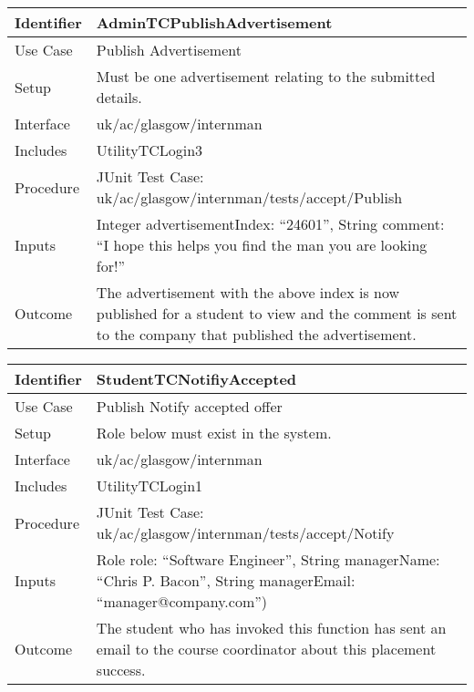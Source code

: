 \vspace{2em}

\begin{tabularx}{\textwidth}{|T|L|}
\hline
Identifier & AdminTCPublishAdvertisement\\
\hline
Use Case & Publish Advertisement\\
\hline
Setup & Must be one advertisement relating to the submitted details.\\
\hline
Interface & uk/ac/glasgow/internman\\
\hline
Includes & UtilityTCLogin3\\
\hline
Procedure & JUnit Test Case: uk/ac/glasgow/internman/tests/accept/Publish\\
\hline
Inputs & Integer advertisementIndex: ``24601'', String comment:
``I hope this helps you find the man you are looking for!''\\
\hline
Outcome & The advertisement with the above index is now published for
a student to view and the comment is sent to the company that
published the advertisement.\\
\hline
\end{tabularx}

\vspace{2em}

\begin{tabularx}{\textwidth}{|T|L|}
\hline
Identifier & StudentTCNotifiyAccepted\\
\hline
Use Case & Publish Notify accepted offer\\
\hline
Setup & Role below must exist in the system.\\
\hline
Interface & uk/ac/glasgow/internman\\
\hline
Includes & UtilityTCLogin1\\
\hline
Procedure & JUnit Test Case: uk/ac/glasgow/internman/tests/accept/Notify\\
\hline
Inputs & Role role: ``Software Engineer'', String managerName: ``Chris
P. Bacon'', String managerEmail: ``manager@company.com'')\\
\hline
Outcome & The student who has invoked this function has sent an email
to the course coordinator about this placement success.\\
\hline
\end{tabularx}
